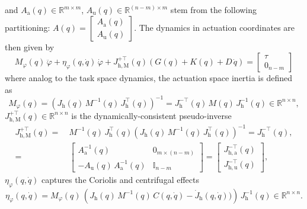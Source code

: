 and $A_\mathrm{a}(q) \in \mathbb{R}^{m \times m}$, $A_\mathrm{u}(q) \in \mathbb{R}^{(n-m) \times m}$ stem from the following partitioning: $A(q) = \begin{bmatrix}
    A_\mathrm{a}(q)\\ A_\mathrm{u}(q)
\end{bmatrix}$.
The dynamics in actuation coordinates are then given by
\begin{equation}
    M_\varphi(q) \, \ddot{\varphi} + \eta_\varphi(q,\dot{q}) \, \dot{\varphi} + J_{\mathrm{h},\mathrm{M}}^{+\top}(q) \left ( G(q) + K(q) + D \, \dot{q} \right ) = \begin{bmatrix}
        \tau\\ 0_{n-m}
    \end{bmatrix}
\end{equation}
where analog to the task space dynamics, the actuation space inertia is defined as~\citep{khatib1987unified}
\begin{equation}\label{eq:background:dynamics:eom_actuation_coordinates}
    M_\varphi(q) = \left ( J_\mathrm{h}(q) \, M^{-1}(q) \, J_\mathrm{h}^\top(q) \right )^{-1} = J_\mathrm{h}^{-\top}(q) \, M(q) \, J_\mathrm{h}^{-1}(q) \in \mathbb{R}^{n \times n},
\end{equation}
$J_{\mathrm{h},\mathrm{M}}^{+\top}(q) \in \mathbb{R}^{n \times n}$ is the dynamically-consistent pseudo-inverse~\citep{chang1995manipulator}
\begin{equation}
\begin{split}
    J_{\mathrm{h},\mathrm{M}}^{+\top}(q) =& \: M^{-1}(q) \, J_\mathrm{h}^\top(q) \left ( J_\mathrm{h}(q) \, M^{-1}(q) \, J_\mathrm{h}^\top(q) \right )^{-1} = J_\mathrm{h}^{-\top}(q),\\
    =& \: \begin{bmatrix}
        A_\mathrm{a}^{-1}(q) & 0_{m \times (n-m)}\\
        -A_\mathrm{u}(q) \, A_\mathrm{a}^{-1}(q) & \mathbb{I}_{n-m}
    \end{bmatrix} = \begin{bmatrix}
        J_{\mathrm{h},\mathrm{a}}^{-\top}(q)\\
        J_{\mathrm{h},\mathrm{u}}^{-\top}(q)
    \end{bmatrix},
\end{split}
\end{equation}
$\eta_\varphi(q,\dot{q})$ captures the Coriolis and centrifugal effects
\begin{equation}
    \eta_\varphi(q, \dot{q}) = M_\varphi(q) \, \left ( J_\mathrm{h}(q) \, M^{-1}(q) \, C(q,\dot{q}) - \dot{J}_\mathrm{h}(q,\dot{q})) \right ) \, J_\mathrm{h}^{-1}(q) \in \mathbb{R}^{n \times n}.
\end{equation}
